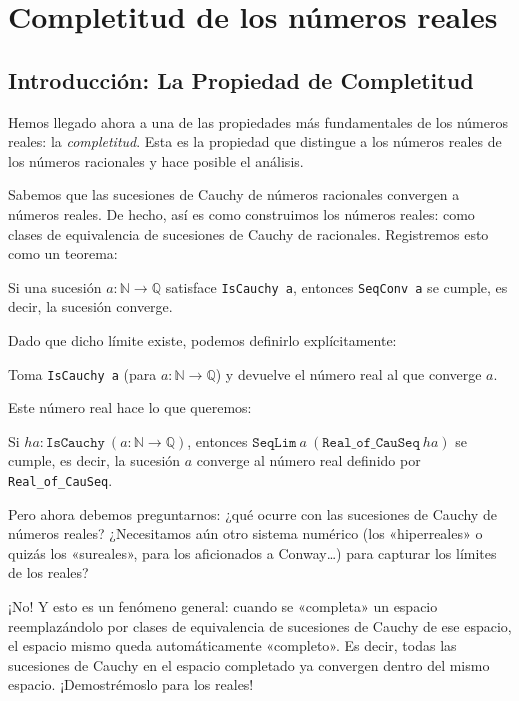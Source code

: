 \chapter{Completitud de los números reales}

\section{Introducción: La Propiedad de Completitud}

Hemos llegado ahora a una de las propiedades más fundamentales de los números
reales: la \emph{completitud}. Esta es la propiedad que distingue a los números
reales de los números racionales y hace posible el análisis.

Sabemos que las sucesiones de Cauchy de números racionales convergen a números
reales. De hecho, así es como construimos los números reales: como clases de
equivalencia de sucesiones de Cauchy de racionales. Registremos esto como un
teorema:

\begin{theorem}
Si una sucesión $a : \mathbb{N} \to \mathbb{Q}$ satisface \texttt{IsCauchy a},
entonces \texttt{SeqConv a} se cumple, es decir, la sucesión converge.
\end{theorem}

Dado que dicho límite existe, podemos definirlo explícitamente:

\begin{definition}
Toma \texttt{IsCauchy a} (para $a : \mathbb{N} \to \mathbb{Q}$) y devuelve el
número real al que converge $a$.
\end{definition}

Este número real hace lo que queremos:

\begin{theorem}
Si $\mathit{ha} : \texttt{IsCauchy}\ (a : \mathbb{N} \to \mathbb{Q})$, entonces
$\texttt{SeqLim}\ a\ (\texttt{Real\_of\_CauSeq}\ \mathit{ha})$ se cumple, es
decir, la sucesión $a$ converge al número real definido por
\texttt{Real\_of\_CauSeq}.
\end{theorem}

Pero ahora debemos preguntarnos: ¿qué ocurre con las sucesiones de Cauchy de
números reales? ¿Necesitamos aún otro sistema numérico (los «hiperreales» o quizás
los «sureales», para los aficionados a Conway\ldots) para capturar los límites de
los reales?

\noindent ¡No! Y esto es un fenómeno general: cuando se «completa» un espacio
reemplazándolo por clases de equivalencia de sucesiones de Cauchy de ese espacio,
el espacio mismo queda automáticamente «completo». Es decir, todas las sucesiones
de Cauchy en el espacio completado ya convergen dentro del mismo espacio.
¡Demostrémoslo para los reales!

